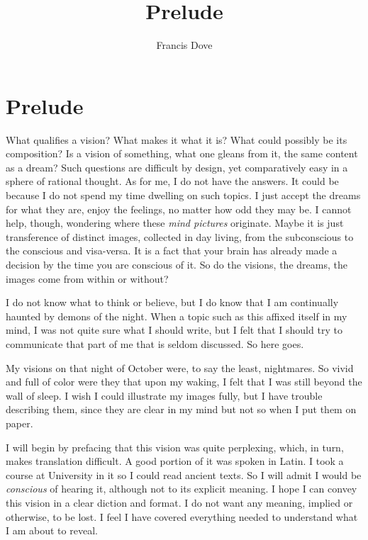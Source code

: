 \documentclass[
]{article}
\title{Prelude}
\author{Francis Dove}
\date{}
\begin{document}
\maketitle

\section{Prelude}\label{prelude}

What qualifies a vision? What makes it what it is? What could possibly
be its composition? Is a vision of something, what one gleans from it,
the same content as a dream? Such questions are difficult by design, yet
comparatively easy in a sphere of rational thought. As for me, I do not
have the answers. It could be because I do not spend my time dwelling on
such topics. I just accept the dreams for what they are, enjoy the
feelings, no matter how odd they may be. I cannot help, though,
wondering where these \emph{mind pictures} originate. Maybe it is just
transference of distinct images, collected in day living, from the
subconscious to the conscious and visa-versa. It is a fact that your
brain has already made a decision by the time you are conscious of it.
So do the visions, the dreams, the images come from within or without?

I do not know what to think or believe, but I do know that I am
continually haunted by demons of the night. When a topic such as this
affixed itself in my mind, I was not quite sure what I should write, but
I felt that I should try to communicate that part of me that is seldom
discussed. So here goes.

My visions on that night of October were, to say the least, nightmares.
So vivid and full of color were they that upon my waking, I felt that I
was still beyond the wall of sleep. I wish I could illustrate my images
fully, but I have trouble describing them, since they are clear in my
mind but not so when I put them on paper.

I will begin by prefacing that this vision was quite perplexing, which,
in turn, makes translation difficult. A good portion of it was spoken in
Latin. I took a course at University in it so I could read ancient
texts. So I will admit I would be \emph{conscious} of hearing it,
although not to its explicit meaning. I hope I can convey this vision in
a clear diction and format. I do not want any meaning, implied or
otherwise, to be lost. I feel I have covered everything needed to
understand what I am about to reveal.
\end{document}
